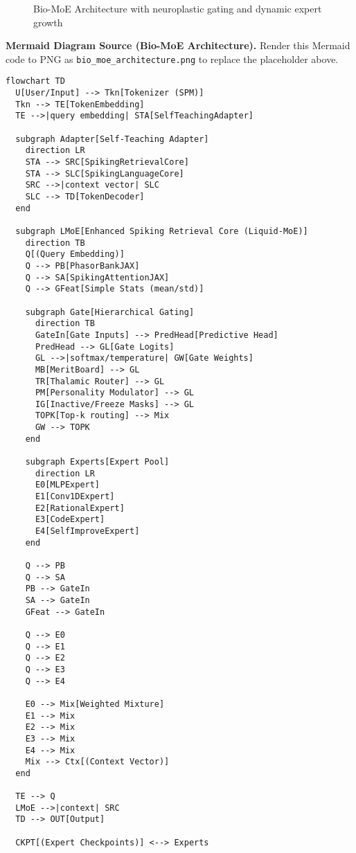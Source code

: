 \documentclass[12pt]{article}
\begin{document}
\begin{figure}[h]
    \centering
    \caption{Bio-MoE Architecture with neuroplastic gating and dynamic expert growth}
\end{figure}

\noindent\textbf{Mermaid Diagram Source (Bio-MoE Architecture).} Render this Mermaid code to PNG as
\texttt{bio\_moe\_architecture.png} to replace the placeholder above.
\begin{verbatim}
flowchart TD
  U[User/Input] --> Tkn[Tokenizer (SPM)]
  Tkn --> TE[TokenEmbedding]
  TE -->|query embedding| STA[SelfTeachingAdapter]

  subgraph Adapter[Self-Teaching Adapter]
    direction LR
    STA --> SRC[SpikingRetrievalCore]
    STA --> SLC[SpikingLanguageCore]
    SRC -->|context vector| SLC
    SLC --> TD[TokenDecoder]
  end

  subgraph LMoE[Enhanced Spiking Retrieval Core (Liquid-MoE)]
    direction TB
    Q[(Query Embedding)]
    Q --> PB[PhasorBankJAX]
    Q --> SA[SpikingAttentionJAX]
    Q --> GFeat[Simple Stats (mean/std)]

    subgraph Gate[Hierarchical Gating]
      direction TB
      GateIn[Gate Inputs] --> PredHead[Predictive Head]
      PredHead --> GL[Gate Logits]
      GL -->|softmax/temperature| GW[Gate Weights]
      MB[MeritBoard] --> GL
      TR[Thalamic Router] --> GL
      PM[Personality Modulator] --> GL
      IG[Inactive/Freeze Masks] --> GL
      TOPK[Top-k routing] --> Mix
      GW --> TOPK
    end

    subgraph Experts[Expert Pool]
      direction LR
      E0[MLPExpert]
      E1[Conv1DExpert]
      E2[RationalExpert]
      E3[CodeExpert]
      E4[SelfImproveExpert]
    end

    Q --> PB
    Q --> SA
    PB --> GateIn
    SA --> GateIn
    GFeat --> GateIn

    Q --> E0
    Q --> E1
    Q --> E2
    Q --> E3
    Q --> E4

    E0 --> Mix[Weighted Mixture]
    E1 --> Mix
    E2 --> Mix
    E3 --> Mix
    E4 --> Mix
    Mix --> Ctx[(Context Vector)]
  end

  TE --> Q
  LMoE -->|context| SRC
  TD --> OUT[Output]

  CKPT[(Expert Checkpoints)] <--> Experts
\end{verbatim}
\end{document}
